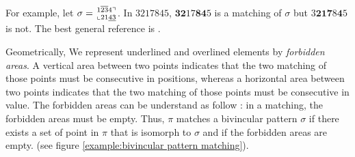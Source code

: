 \documentclass[a4paper]{llncs}
\newcommand\BV[2]{\genfrac{}{}{0pt}{}{#1}{#2}}
\begin{document}
For example,
let
$\sigma = \BV{1\overline{23}4\urcorner}{\llcorner 21\underline{43}  }$.
In $3217845$, $\textbf{32}17\textbf{84}5$ is a matching of $\sigma$ but
 $3\textbf{21}\textbf{7}8\textbf{4}5$ is not.
The best general reference is \cite{Kitaev:book:2011}.

Geometrically, We represent underlined and overlined elements by \textit{forbidden areas}.
A vertical area between two points indicates that the two matching of those points must be consecutive in positions, whereas a horizontal area between two points indicates that the two  matching of those points must be consecutive in value. The forbidden areas can be understand as follow : in a matching, the forbidden areas must be empty. Thus, 
$\pi$ matches a bivincular pattern $\sigma$ if there exists a set of point in $\pi$ that is isomorph to $\sigma$ and if
the forbidden areas are empty.
(see figure \ref{example:bivincular pattern matching}).
\end{document}
